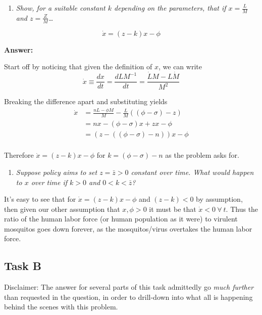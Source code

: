 \documentclass[
]{article}
\providecommand{\tightlist}{%
  \setlength{\itemsep}{0pt}\setlength{\parskip}{0pt}}
\begin{document}
\begin{enumerate}
\def\labelenumi{\arabic{enumi}.}
\tightlist
\item
  \emph{Show, for a suitable constant \(k\) depending on the parameters,
  that if \(x = \frac{L}{M}\) and \(z = \frac{Z}{M}\)\ldots{}}
\end{enumerate}

\[ \dot{x} = (z-k)x - \phi \]

\textbf{Answer:}

Start off by noticing that given the definition of \(x\), we can write
\[\dot{x} \equiv \frac{dx}{dt} =  \frac{dLM^{-1}}{dt} = \frac{\dot{L}M - L\dot{M}}{M^2} \]

Breaking the difference apart and substituting yields \begin{align} 

\dot{x} &= \frac{nL - \phi M}{M} - \frac{L}{M}((\phi - \sigma) - z) \\
        &= nx - (\phi - \sigma)x + zx - \phi \\
        &= (z - ((\phi - \sigma )- n) )x - \phi \\
\end{align}

Therefore \(\dot{x} = (z-k)x - \phi\) for \(k = (\phi - \sigma) - n\) as
the problem asks for.

\begin{enumerate}
\def\labelenumi{\arabic{enumi}.}
\setcounter{enumi}{1}
\tightlist
\item
  \emph{Suppose policy aims to set \(z = \bar{z} > 0\) constant over
  time. What would happen to \(x\) over time if \(k>0\) and
  \(0<k<\bar{z}\)?}
\end{enumerate}

It's easy to see that for \(\dot{x} = (z-k)x - \phi\) and \((z-k)<0\) by
assumption, then given our other assumption that \(x,\phi > 0\) it must
be that \(\dot{x} < 0 \ \forall \ t\). Thus the ratio of the human labor
force (or human population as it were) to virulent mosquitos goes down
forever, as the mosquitos/virus overtakes the human labor force.

\hypertarget{task-b}{%
\subsection{Task B}\label{task-b}}

Disclaimer: The answer for several parts of this task admittedly go
\emph{much further} than requested in the question, in order to
drill-down into what all is happening behind the scenes with this
problem.
\end{document}
